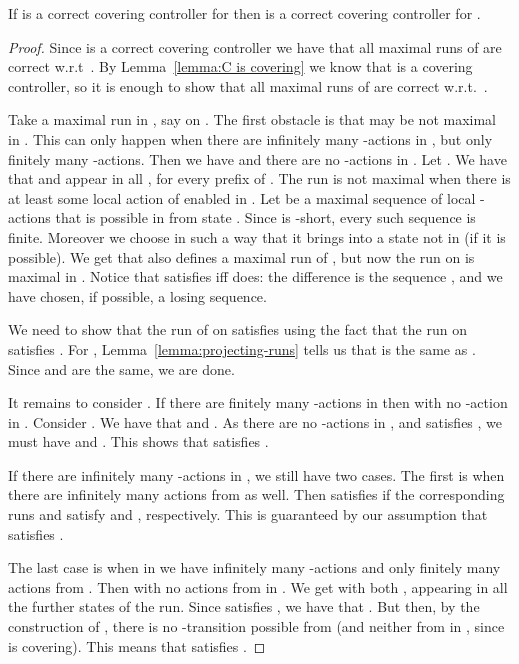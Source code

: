 \documentclass[10pt,a4paper]{article}
\begin{document}
\begin{lemma}\label{lemma:C correct}
  If  is a correct covering controller for  then 
  is a correct covering controller for .
\end{lemma}
\begin{proof}
  Since  is a correct covering controller we have that
  all maximal runs of  are correct w.r.t~.  By
  Lemma~\ref{lemma:C is covering} we 
  know that  is a covering controller,
  so it is enough to show that all maximal runs of  are
  correct w.r.t.~.

  Take a maximal run in , say on . The
  first obstacle is that  may be not maximal in
  . This can only happen when there are infinitely many
  -actions in , but only finitely many -actions. Then we have
   and there are no -actions in . Let
  . We have that  and  appear
  in all , for every prefix  of . The
  run  is not maximal when there is at least some
  local action of  enabled in . Let  be a maximal
  sequence of local -actions that is possible in  from state
  . Since  is -short, every such sequence is
  finite. Moreover we choose  in such a way that it brings 
  into a state not in  (if it is possible).  We get that
   also defines a maximal run of , but now the run
  on  is maximal in . Notice that 
  satisfies  iff  does: the difference is the
  sequence , and we have chosen, if possible, a losing sequence.

  We need to show that the run of  on  satisfies
   using the fact that the run on  satisfies
  .  For , Lemma~\ref{lemma:projecting-runs} tells us
  that  is the same as . Since
   and  are the same, we are done.

  It remains to consider . If there are finitely many
  -actions  in  then   with no
  -action in . Consider
  . We have that
   and . As there
  are no -actions in , and  satisfies
  , we must have  and . This shows that
   satisfies .

  If there are infinitely many -actions in , we
  still have two cases. The first is when there are infinitely many
  actions from  as well. Then 
  satisfies  if the corresponding runs 
  and  satisfy  and ,
  respectively. This is guaranteed by our assumption that 
  satisfies .

  The last case is when in  we have infinitely
  many -actions and only finitely many actions from . Then 
  with no actions from  in . We get 
  with both ,  appearing in all the further states of the
  run. Since  satisfies , we have that
  . But then, by the construction of , there is
  no -transition possible from  (and neither from
   in , since  is covering). This means that 
  satisfies .


\end{proof}
\end{document}
